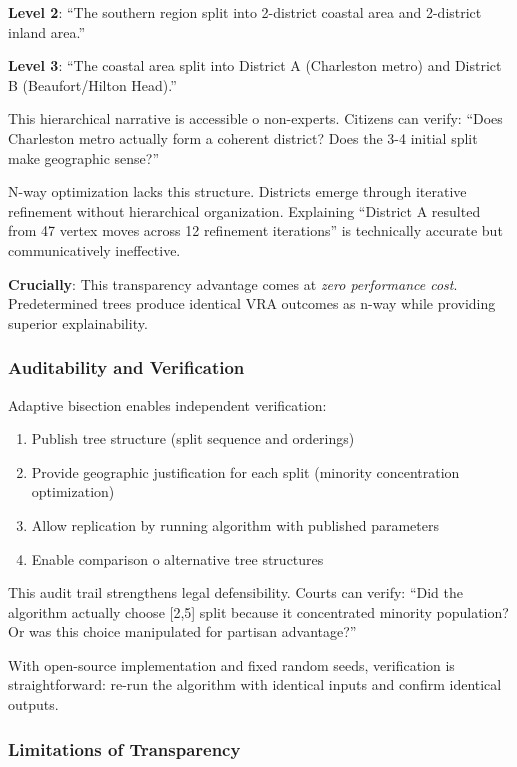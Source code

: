 \textbf{Level 2}: ``The southern region split into 2-district coastal area and 2-district inland area.''

\textbf{Level 3}: ``The coastal area split into District A (Charleston metro) and District B (Beaufort/Hilton Head).''

This hierarchical narrative is accessible 	o non-experts. Citizens can verify: ``Does Charleston metro actually form a coherent district? Does the 3-4 initial split make geographic sense?''

N-way optimization lacks this structure. Districts emerge through iterative refinement without hierarchical organization. Explaining ``District A resulted from 47 vertex moves across 12 refinement iterations'' is technically accurate but communicatively ineffective.

\textbf{Crucially}: This transparency advantage comes at \textit{zero performance cost}. Predetermined trees produce identical VRA outcomes as n-way while providing superior explainability.

\subsubsection{Auditability and Verification}

Adaptive bisection enables independent verification:
\begin{enumerate}
\item Publish tree structure (split sequence and orderings)
\item Provide geographic justification for each split (minority concentration optimization)
\item Allow replication by running algorithm with published parameters
\item Enable comparison 	o alternative tree structures
\end{enumerate}

This audit trail strengthens legal defensibility. Courts can verify: ``Did the algorithm actually choose [2,5] split because it concentrated minority population? Or was this choice manipulated for partisan advantage?''

With open-source implementation and fixed random seeds, verification is straightforward: re-run the algorithm with identical inputs and confirm identical outputs.

\subsubsection{Limitations of Transparency}

